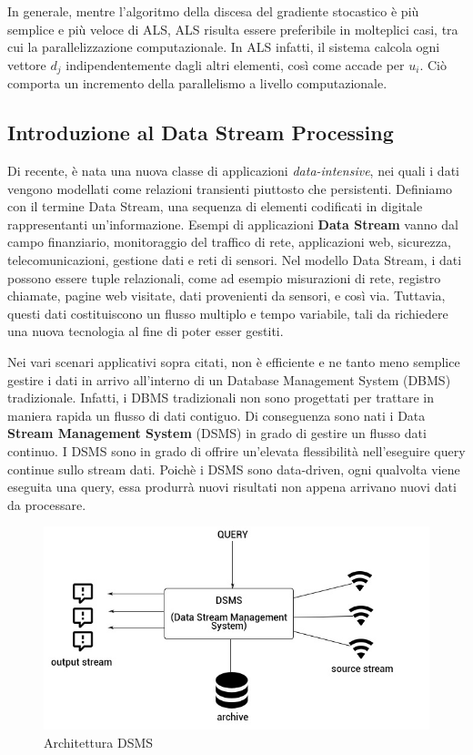 \documentclass[11pt]{article}
\begin{document}
In generale, mentre l'algoritmo della discesa del gradiente stocastico è più semplice e più veloce di ALS, ALS risulta essere preferibile in molteplici casi, tra cui la parallelizzazione computazionale. In ALS infatti, il sistema calcola ogni vettore $d_j$ indipendentemente dagli altri elementi, così come accade per $u_i$. Ciò comporta un incremento della parallelismo a livello computazionale.

\subsection{Introduzione al Data Stream Processing}
Di recente, è nata una nuova classe di applicazioni \textit{data-intensive}, nei quali i dati vengono modellati come relazioni transienti piuttosto che persistenti. Definiamo con il termine Data Stream, una sequenza di elementi codificati in digitale rappresentanti un'informazione. Esempi di applicazioni \textbf{Data Stream} vanno dal campo finanziario, monitoraggio del traffico di rete, applicazioni web, sicurezza, telecomunicazioni, gestione dati e reti di sensori. Nel modello Data Stream, i dati possono essere tuple relazionali, come ad esempio misurazioni di rete, registro chiamate, pagine web visitate, dati provenienti da sensori, e così via. Tuttavia, questi dati costituiscono un flusso multiplo e tempo variabile, tali da richiedere una nuova tecnologia al fine di poter esser gestiti.

Nei vari scenari applicativi sopra citati, non è efficiente e ne tanto meno semplice gestire i dati in arrivo all'interno di un Database Management System (DBMS) tradizionale. Infatti, i DBMS tradizionali non sono progettati per trattare in maniera rapida un flusso di dati contiguo. Di conseguenza sono nati i Data \textbf{Stream Management System} (DSMS) in grado di gestire un flusso dati continuo. I DSMS sono in grado di offrire un'elevata flessibilità nell'eseguire query continue sullo stream dati. Poichè i DSMS sono data-driven, ogni qualvolta viene eseguita una query, essa produrrà nuovi risultati non appena arrivano nuovi dati da processare.

\begin{figure}[H]
	\centering
	\includegraphics[scale=0.50]{images/dsms.jpg}
	\caption{Architettura DSMS}
	\label{dsms}
\end{figure}
\end{document}

